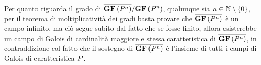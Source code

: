 \par Per quanto riguarda il grado di $\overline{\textbf{GF} \left ( P^n \right )}/\textbf{GF} \left ( P^n \right )$, qualunque sia $n \in \mathbb{N} \setminus \lbrace 0 \rbrace$, per il teorema di moltiplicativit\`a dei gradi basta provare che $\overline{\textbf{GF} \left ( P^n \right )}$ \`e un campo infinito, ma ci\`o segue subito dal fatto che se fosse finito, allora esisterebbe un campo di Galois di cardinalit\`a maggiore e stessa caratteristica di $\overline{\textbf{GF} \left ( P^n \right )}$, in contraddizione col fatto che il sostegno di $\overline{\textbf{GF} \left ( P^n \right )}$ \`e l'insieme di tutti i campi di Galois di caratteristica $P$. \EndProof
